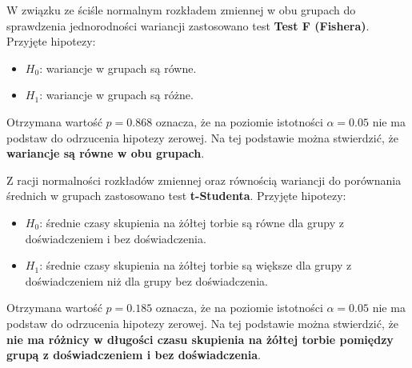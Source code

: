     W związku ze ściśle normalnym rozkładem zmiennej w obu grupach do sprawdzenia jednorodności wariancji zastosowano test \textbf{Test F (Fishera)}.
    Przyjęte hipotezy:
    \begin{itemize}
        \item $H_0$: wariancje w grupach są równe.
        \item $H_1$: wariancje w grupach są różne.
    \end{itemize}
    Otrzymana wartość $p=0.868$ oznacza, że na poziomie istotności $\alpha=0.05$ nie ma podstaw do odrzucenia hipotezy zerowej.
    Na tej podstawie można stwierdzić, że \textbf{wariancje są równe w obu grupach}.

    Z racji normalności rozkładów zmiennej oraz równością wariancji do porównania średnich w grupach zastosowano test \textbf{t-Studenta}.
    Przyjęte hipotezy:
    \begin{itemize}
        \item $H_0$: średnie czasy skupienia na żółtej torbie są równe dla grupy z doświadczeniem i bez doświadczenia.
        \item $H_1$: średnie czasy skupienia na żółtej torbie są większe dla grupy z doświadczeniem niż dla grupy bez doświadczenia.
    \end{itemize}

    Otrzymana wartość $p=0.185$ oznacza, że na poziomie istotności $\alpha=0.05$ nie ma podstaw do odrzucenia hipotezy zerowej.
    Na tej podstawie można stwierdzić, że \textbf{nie ma różnicy w długości czasu skupienia na żółtej torbie pomiędzy grupą z doświadczeniem i bez doświadczenia}.